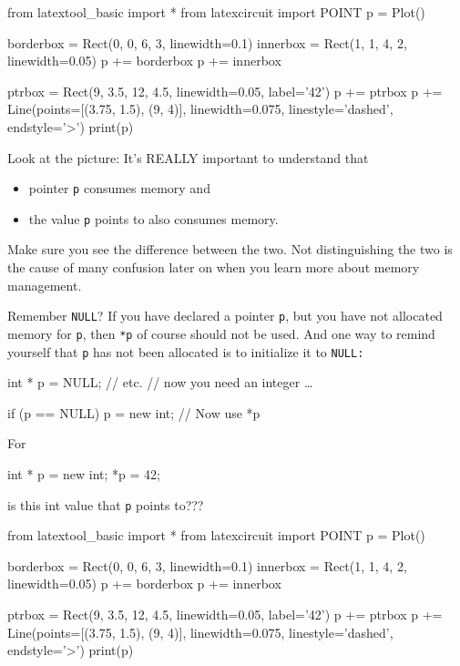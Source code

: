 \begin{python}
from latextool_basic import *
from latexcircuit import POINT
p = Plot()

borderbox = Rect(0, 0, 6, 3, linewidth=0.1)
innerbox = Rect(1, 1, 4, 2, linewidth=0.05)
p += borderbox
p += innerbox

ptrbox = Rect(9, 3.5, 12, 4.5, linewidth=0.05, label='42')
p += ptrbox
p += Line(points=[(3.75, 1.5), (9, 4)], linewidth=0.075, linestyle='dashed', endstyle='>')
print(p)
\end{python}

Look at the picture: It's REALLY important to understand that

\begin{itemize}

\item
  pointer \texttt{p} consumes memory and
\item
  the value \texttt{p} points to also consumes memory.
\end{itemize}

Make sure you see the difference between the two. Not distinguishing the two is the cause of many confusion later on when you learn more about memory management.


Remember \texttt{NULL}? If you have declared a pointer \texttt{p}, but you have not allocated memory for \texttt{p}, then \texttt{*p} of course should not be used. And one way to remind yourself that \texttt{p} has not been allocated is to initialize it to \texttt{NULL:}

\begin{consolethree}[escapeinside=||]
int * p = NULL;
                // etc.
                // now you need an integer \ldots

if (p == NULL)
{
    p = new int;
}
// Now use *p
\end{consolethree}



For

\begin{consolethree}[escapeinside=||]
int * p = new int;
*p = 42;
\end{consolethree}
\textit{} is this int value that \texttt{p} points to???
\begin{python}
from latextool_basic import *
from latexcircuit import POINT
p = Plot()

borderbox = Rect(0, 0, 6, 3, linewidth=0.1)
innerbox = Rect(1, 1, 4, 2, linewidth=0.05)
p += borderbox
p += innerbox

ptrbox = Rect(9, 3.5, 12, 4.5, linewidth=0.05, label='42')
p += ptrbox
p += Line(points=[(3.75, 1.5), (9, 4)], linewidth=0.075, linestyle='dashed', endstyle='>')
print(p)
\end{python}

